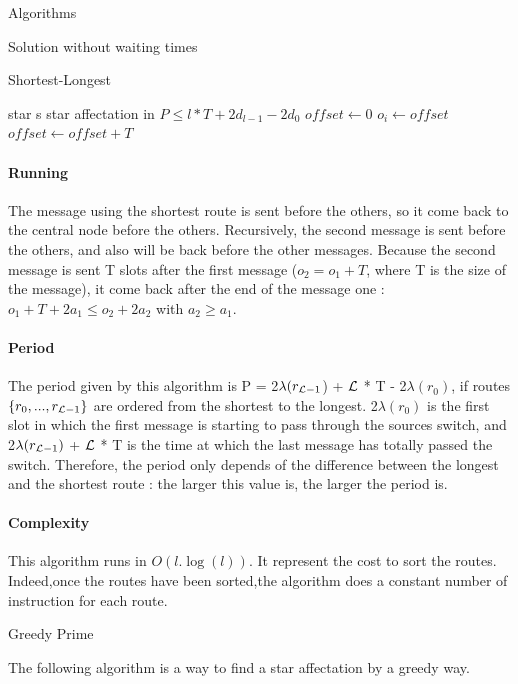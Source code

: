 \documentclass[a4paper,10pt]{report}
\begin{document}
\begin{chapter}{Algorithms}
\begin{section}{Solution without waiting times}
\begin{subsection}{Shortest-Longest}
\begin{algorithm}[H]
\begin{algorithmic}
\REQUIRE star s
\ENSURE star affectation in $P \le l*T + 2d_{l-1} - 2d_0$
\STATE $offset \leftarrow 0$
\STATE $o_i \leftarrow offset$
\STATE $offset \leftarrow offset+T$
\ENDFOR

\end{algorithmic}
\end{algorithm}

\paragraph{Running}

The message using the shortest route is sent before the others, so it come back to the central node before the others.
Recursively, the second message is sent before the others, and also will be back before the other messages. 
Because the second message is sent T slots after the first message ($o_2 = o_1 + T$, where T is the size of the message), it come back after
the end of the message one : $o_1+ T + 2a_1 \le o_2 + 2a_2$ with $a_2 \ge a_1$.

\paragraph{Period}
The period given by this algorithm is P = 2$\lambda(r_{{\cal L}-1}$) + ${\cal L}$ * T - 2$\lambda(r_0)$, if routes $\{r_0,...,r_{{\cal L}-1}\}$ are ordered
from the shortest to the longest. 2$\lambda(r_0)$ is the first slot in which the first message is starting to pass through the sources switch,
and 2$\lambda(r_{{\cal L}-1})$ + ${\cal L}$ * T  is the time at which the last message has totally passed the switch.
Therefore, the period only depends of the difference between the longest and the shortest route : the larger this value is, the larger
the period is.

\paragraph{Complexity}
This algorithm runs in $O(l.\log(l))$. It represent the cost to sort the routes.
Indeed,once the routes have been sorted,the algorithm does a constant number of instruction for each route.
\end{subsection}

\begin{subsection}{Greedy Prime}

The following algorithm is a way to find a star affectation by a greedy way.


\end{subsection}
\end{section}
\end{chapter}
\end{document}
